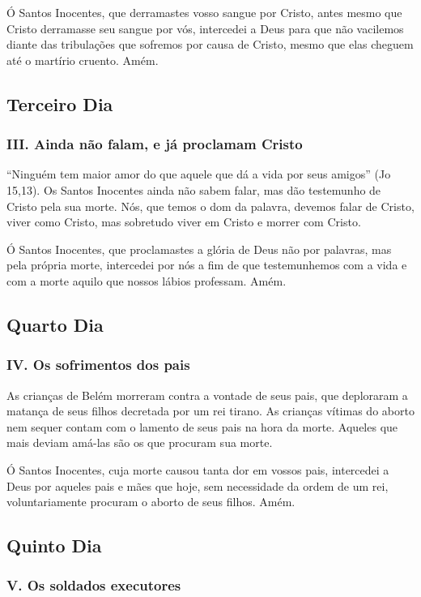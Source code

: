 \documentclass[11pt]{article}
\begin{document}
Ó Santos Inocentes, que derramastes vosso sangue por Cristo, antes mesmo que Cristo derramasse seu sangue por vós, intercedei a Deus para que não vacilemos diante das tribulações que sofremos por causa de Cristo, mesmo que elas cheguem até o martírio cruento. Amém.

\subsection{Terceiro Dia}
\subsubsection*{III. Ainda não falam, e já proclamam Cristo}

“Ninguém tem maior amor do que aquele que dá a vida por seus amigos” (Jo 15,13). Os Santos Inocentes ainda não sabem falar, mas dão testemunho de Cristo pela sua morte. Nós, que temos o dom da palavra, devemos falar de Cristo, viver como Cristo, mas sobretudo viver em Cristo e morrer com Cristo.

Ó Santos Inocentes, que proclamastes a glória de Deus não por palavras, mas pela própria morte, intercedei por nós a fim de que testemunhemos com a vida e com a morte aquilo que nossos lábios professam. Amém.

\subsection{Quarto Dia}
\subsubsection*{IV. Os sofrimentos dos pais}

As crianças de Belém morreram contra a vontade de seus pais, que deploraram a matança de seus filhos decretada por um rei tirano. As crianças vítimas do aborto nem sequer contam com o lamento de seus pais na hora da morte. Aqueles que mais deviam amá-las são os que procuram sua morte.

Ó Santos Inocentes, cuja morte causou tanta dor em vossos pais, intercedei a Deus por aqueles pais e mães que hoje, sem necessidade da ordem de um rei, voluntariamente procuram o aborto de seus filhos. Amém.

\subsection{Quinto Dia}
\subsubsection*{V. Os soldados executores}
\end{document}
